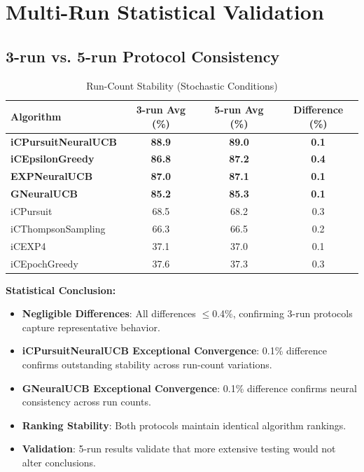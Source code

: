 \documentclass[12pt,a4paper]{article}
\newcommand{\success}[1]{\textcolor{accentgreen}{\textbf{#1}}}
\newcommand{\legacy}[1]{\textcolor{legacycolor}{\textbf{#1}}}
\newcommand{\neural}[1]{\textcolor{neuralcolor}{\textbf{#1}}}
\begin{document}
\section{Multi-Run Statistical Validation}

\subsection{3-run vs. 5-run Protocol Consistency}

\begin{table}[H]
\centering
\caption{Run-Count Stability (Stochastic Conditions)}
\label{tab:run-count}
\begin{tabular}{@{}lccc@{}}
\toprule
\textbf{Algorithm} & \textbf{3-run Avg (\%)} & \textbf{5-run Avg (\%)} & \textbf{Difference (\%)} \\
\midrule
\neural{iCPursuitNeuralUCB}   & \neural{88.9} & \neural{89.0} & \neural{0.1} \\
\success{iCEpsilonGreedy}   & \success{86.8} & \success{87.2} & \success{0.4} \\
\legacy{EXPNeuralUCB}       & \legacy{87.0} & \legacy{87.1} & \legacy{0.1} \\
\neural{GNeuralUCB}        & \neural{85.2} & \neural{85.3} & \neural{0.1} \\
iCPursuit                   & 68.5 & 68.2 & 0.3 \\
iCThompsonSampling          & 66.3 & 66.5 & 0.2 \\
iCEXP4                      & 37.1 & 37.0 & 0.1 \\
iCEpochGreedy               & 37.6 & 37.3 & 0.3 \\
\bottomrule
\end{tabular}
\end{table}

\textbf{Statistical Conclusion:}
\begin{itemize}
\item \success{Negligible Differences}: All differences $\leq$0.4\%, confirming 3-run protocols capture representative behavior.
\item \neural{iCPursuitNeuralUCB Exceptional Convergence}: 0.1\% difference confirms outstanding stability across run-count variations.
\item \neural{GNeuralUCB Exceptional Convergence}: 0.1\% difference confirms neural consistency across run counts.
\item \success{Ranking Stability}: Both protocols maintain identical algorithm rankings.
\item \success{Validation}: 5-run results validate that more extensive testing would not alter conclusions.
\end{itemize}
\end{document}
